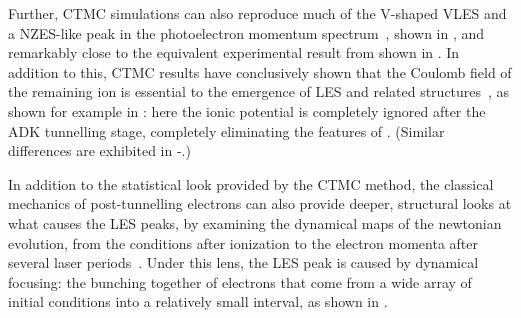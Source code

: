 Further, CTMC simulations can also reproduce much of the V-shaped VLES and a NZES-like peak in the photoelectron momentum spectrum~\cite{xia_near-zero-energy_2015}, shown in , and remarkably close to the equivalent experimental result from  shown in . In addition to this, CTMC results have conclusively shown that the Coulomb field of the remaining ion is essential to the emergence of LES and related structures~\cite{zhi_Coulomb-LES_2014, xia_near-zero-energy_2015}, as shown for example in : here the ionic potential is completely ignored after the ADK tunnelling stage, completely eliminating the features of . (Similar differences are exhibited in -.)



In addition to the statistical look provided by the CTMC method, the classical mechanics of post-tunnelling electrons can also provide deeper, structural looks at what causes the LES peaks, by examining the dynamical maps of the newtonian evolution, from the conditions after ionization to the electron momenta after several laser periods~\cite{Rost_PRL, Rost_JPhysB}. Under this lens, the LES peak is caused by dynamical focusing: the bunching together of electrons that come from a wide array of initial conditions into a relatively small interval, as shown in .





